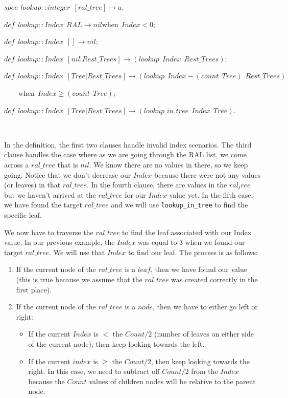 \documentclass[
]{book}
\providecommand{\tightlist}{%
  \setlength{\itemsep}{0pt}\setlength{\parskip}{0pt}}
\begin{document}
\begin{formulabox}
\(spec ~ ~ lookup :: integer ~ ~ [ral\_tree] \rightarrow a.\)

\(de\mathit{f} ~ ~ lookup :: Index ~ ~ RAL \rightarrow nil \text{when} ~ ~ Index < 0;\)

\(de\mathit{f} ~ ~ lookup :: Index ~ ~ [] \rightarrow nil;\)

\(de\mathit{f} ~ ~ lookup :: Index ~ ~ [nil|Rest\_Trees] \rightarrow (lookup ~ ~ Index ~ ~ Rest\_Trees);\)

\(de\mathit{f} ~ ~ lookup :: Index ~ ~ [Tree|Rest\_Trees] \rightarrow (lookup ~ ~ Index-(count ~ ~ Tree) ~ ~ Rest\_Trees)\)

\(\quad \quad \text{when} ~ ~ Index \geq (count ~ ~ Tree);\)

\(de\mathit{f} ~ ~ lookup :: Index ~ ~ [Tree|Rest\_Trees] \rightarrow (lookup\_in\_tree ~ ~ Index ~ ~ Tree).\)

\end{formulabox}

\(\nonumber\)

In the definition, the first two clauses handle invalid index scenarios. The third clause handles the case where as we are going through the RAL list, we come across a \(ral\_tree\) that is \(nil\). We know there are no values in there, so we keep going. Notice that we don't decrease our \(Index\) because there were not any values (or leaves) in that \(ral\_tree\). In the fourth clause, there are values in the \(ral_tree\) but we haven't arrived at the \(ral\_tree\) for our \(Index\) value yet. In the fifth case, we have found the target \(ral\_tree\) and we will use \texttt{lookup\_in\_tree} to find the specific leaf.

We now have to traverse the \(ral\_tree\) to find the leaf associated with our Index value. In our previous example, the \(Index\) was equal to 3 when we found our target \(ral\_tree\). We will use that \(Index\) to find our leaf. The process is as follows:

\begin{enumerate}
\def\labelenumi{\arabic{enumi}.}
\tightlist
\item
  If the current node of the \(ral\_tree\) is a \(leaf\), then we have found our value (this is true because we assume that the \(ral\_tree\) was created correctly in the first place).
\item
  If the current node of the \(ral\_tree\) is a \(node\), then we have to either go left or right:

  \begin{itemize}
  \tightlist
  \item
    If the current \(Index\) is \(<\) the \(Count / 2\) (number of leaves on either side of the current node), then keep looking towards the left.
  \item
    If the current \(index\) is \(\geq\) the \(Count / 2\), then keep looking towards the right. In this case, we need to subtract off \(Count / 2\) from the \(Index\) because the \(Count\) values of children nodes will be relative to the parent node.
  \end{itemize}
\end{enumerate}
\end{document}
